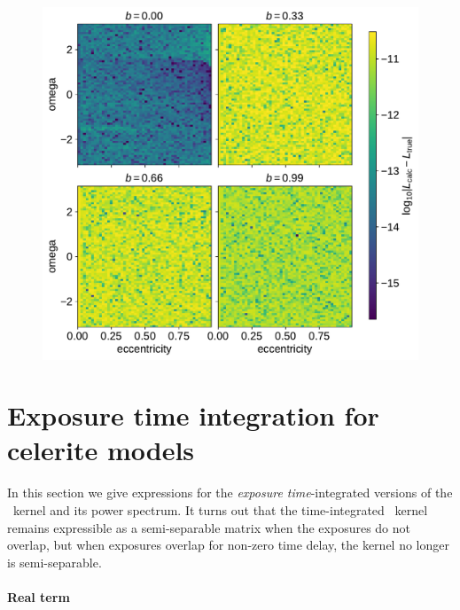 \documentclass[modern]{aastex62}
\begin{document}
\begin{figure}[htbp]
\begin{centering}
\includegraphics[width=0.8\linewidth]{figures/contact_points.pdf}
\end{centering}
\end{figure}

\section{Exposure time integration for celerite models} \label{sec:time_integration}

In this section we give expressions for the {\it exposure time}-integrated versions of the \celerite\ kernel and its power
spectrum.  It turns out that the time-integrated \celerite\ kernel
remains expressible as a semi-separable matrix when the exposures
do not overlap, but when exposures overlap for non-zero time delay,
the kernel no longer is semi-separable.

\paragraph{Real term}
\end{document}
